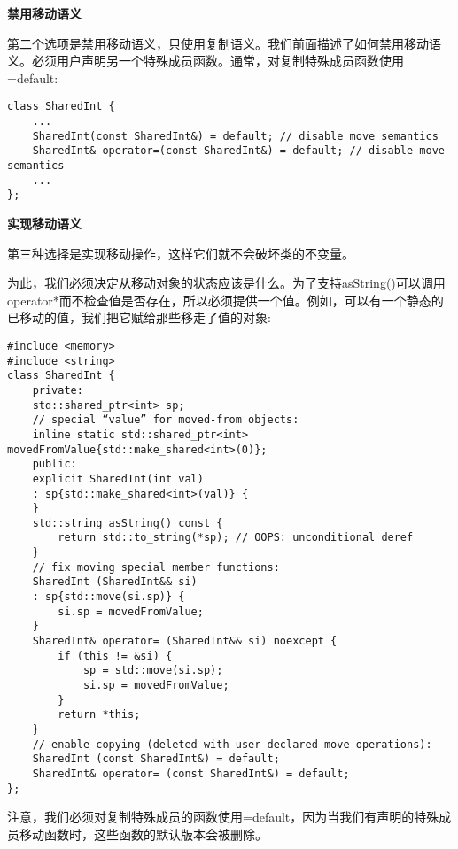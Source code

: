 \hspace*{\fill} \par %
\textbf{禁用移动语义}

第二个选项是禁用移动语义，只使用复制语义。我们前面描述了如何禁用移动语义。必须用户声明另一个特殊成员函数。通常，对复制特殊成员函数使用=default:\par

\begin{lstlisting}[caption={}]
class SharedInt {
	...
	SharedInt(const SharedInt&) = default; // disable move semantics
	SharedInt& operator=(const SharedInt&) = default; // disable move semantics
	...
};
\end{lstlisting}

\hspace*{\fill} \par %
\textbf{实现移动语义}

第三种选择是实现移动操作，这样它们就不会破坏类的不变量。\par

为此，我们必须决定从移动对象的状态应该是什么。为了支持asString()可以调用operator*而不检查值是否存在，所以必须提供一个值。例如，可以有一个静态的已移动的值，我们把它赋给那些移走了值的对象:\par

{\color{red}{basics/sharedint.hpp}}

\begin{lstlisting}[caption={}]
#include <memory>
#include <string>
class SharedInt {
	private:
	std::shared_ptr<int> sp;
	// special “value” for moved-from objects:
	inline static std::shared_ptr<int> movedFromValue{std::make_shared<int>(0)};
	public:
	explicit SharedInt(int val)
	: sp{std::make_shared<int>(val)} {
	}
	std::string asString() const {
		return std::to_string(*sp); // OOPS: unconditional deref
	}
	// fix moving special member functions:
	SharedInt (SharedInt&& si)
	: sp{std::move(si.sp)} {
		si.sp = movedFromValue;
	}
	SharedInt& operator= (SharedInt&& si) noexcept {
		if (this != &si) {
			sp = std::move(si.sp);
			si.sp = movedFromValue;
		}
		return *this;
	}
	// enable copying (deleted with user-declared move operations):
	SharedInt (const SharedInt&) = default;
	SharedInt& operator= (const SharedInt&) = default;
};
\end{lstlisting}

注意，我们必须对复制特殊成员的函数使用=default，因为当我们有声明的特殊成员移动函数时，这些函数的默认版本会被删除。\par


















































